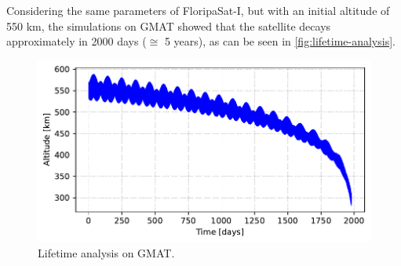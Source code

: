Considering the same parameters of FloripaSat-I, but with an initial altitude of 550 km, the simulations on GMAT showed that the satellite decays approximately in 2000 days ($\cong$ 5 years), as can be seen in \autoref{fig:lifetime-analysis}.

\begin{figure}[!ht]
    \begin{center}
        \includegraphics[width=\columnwidth]{curves/lifetime.pdf}
        \caption{Lifetime analysis on GMAT.}
        \label{fig:lifetime-analysis}
    \end{center}
\end{figure}
